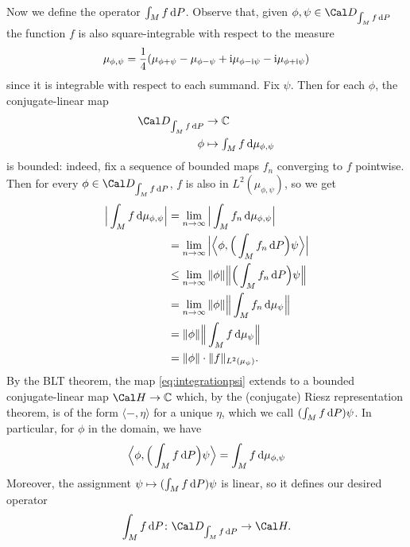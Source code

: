 Now we define the operator \(\int_Mf\mathop{}\!\mathrm{d} P\).
Observe that, given \(\phi,\psi\in\Cal D_{\int_Mf\d P}\) the
function \(f\) is also square-integrable with respect to the measure
\begin{equation}
  \mu_{\phi,\psi}
  = \frac{1}{4}
  (\mu_{\phi+\psi}-\mu_{\phi-\psi}+\mathrm{i}\mu_{\phi-\mathrm{i}\psi}-\mathrm{i}\mu_{\phi+\mathrm{i}\psi})
\end{equation}
since it is integrable with respect to each summand.
Fix \(\psi\). Then for each \(\phi\), the conjugate-linear map
\begin{align}
  \label{eq:integrationpsi}
  \Cal D_{\int_Mf\d P} & \to \C \\
  \phi&\mapsto\textstyle\int_{M}f\d\mu_{\phi,\psi}
\end{align}
is bounded: indeed, fix a sequence of bounded maps \(f_n\) converging to
\(f\) pointwise.
Then for every \(\phi\in\Cal D_{\int_Mf\d P}\), \(f\) is also in
\(L^{2}(\mu_{\phi,\psi})\), so we get
\begin{align}
  \Big |\int_{M}f\mathop{}\!\mathrm{d}\mu_{\phi,\psi} \Big |
  &= \lim_{n\to\infty}\Big |\int_{M}f_n\mathop{}\!\mathrm{d}\mu_{\phi,\psi} \Big | \\
  &= \lim_{n\to\infty}
  \Big |\Big\langle
    \phi ,\Big(\int_{M}f_n\mathop{}\!\mathrm{d} P\Big)\psi
  \Big\rangle\Big | \\
  &\leq \lim_{n\to\infty}
    \|\phi\|\Big\|\Big(\int_{M}f_n\mathop{}\!\mathrm{d} P\Big)\psi\Big\| \\
  &= \lim_{n\to\infty}
    \|\phi\|\Big\|\int_{M}f_n\mathop{}\!\mathrm{d}\mu_\psi\Big\| \\
  &= \|\phi\|\Big\|\int_{M}f\mathop{}\!\mathrm{d}\mu_\psi\Big\| \\
  &= \|\phi\| \cdot \|f\|_{L^{2}(\mu_\psi)}.
\end{align}
By the BLT theorem, the map \eqref{eq:integrationpsi} 
extends to a bounded conjugate-linear map
\(\Cal H\to\C\) which, by the (conjugate) Riesz representation theorem,
is of the form \(\langle-,\eta\rangle\) for a unique \(\eta\), which
we call \((\int_Mf\mathop{}\!\mathrm{d} P)\psi\).
In particular, for \(\phi\) in the domain, we have
\begin{equation}
  \Big\langle \phi, \Big(\int_Mf\mathop{}\!\mathrm{d} P\Big)\psi\Big\rangle
  =
  \int_{M}f\mathop{}\!\mathrm{d}\mu_{\phi,\psi}
\end{equation}
Moreover, the assignment \(\psi\mapsto
(\int_Mf\mathop{}\!\mathrm{d} P)\psi\) is linear, so it defines our desired operator
\begin{equation}
  \int_Mf\d P \colon \Cal D_{\int_Mf\d P} \to \Cal H.
\end{equation}

